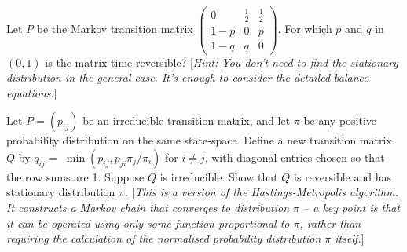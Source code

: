\documentclass[answers]{exam}
\begin{document}
\begin{questions}



\question%
Let $P$ be the Markov transition matrix $\begin{pmatrix}0 & \frac{1}{2} & \frac{1}{2} \\ 1-p & 0 & p \\ 1-q & q & 0\end{pmatrix}$. For which $p$ and $q$ in $(0,1)$ is the matrix time-reversible? [\emph{Hint: You don't need to find the stationary distribution in the general case. It's enough to consider the detailed balance equations.}]



\question%
Let $P=(p_{i j})$ be an irreducible transition matrix, and let $\pi$ be any positive probability distribution on the same state-space. Define a new transition matrix $Q$ by $q_{i j}=$ $\min (p_{i j}, p_{j i} \pi_{j} / \pi_{i})$ for $i \neq j$, with diagonal entries chosen so that the row sums are 1. Suppose $Q$ is irreducible. Show that $Q$ is reversible and has stationary distribution $\pi$. [\emph{This is a version of the Hastings-Metropolis algorithm. It constructs a Markov chain that converges to distribution $\pi$ -- a key point is that it can be operated using only some function proportional to $\pi$, rather than requiring the calculation of the normalised probability distribution $\pi$ itself.}]




\end{questions}
\end{document}
